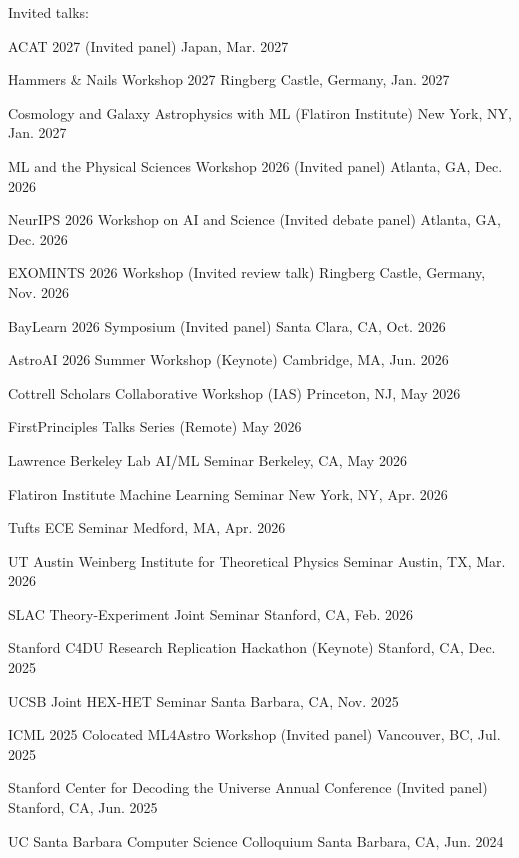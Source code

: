 \documentclass[letterpaper,11pt]{article}
\newenvironment{packed_itemize}{
\begin{itemize}[label=\raisebox{0.25ex}{\tiny$\bullet$}, topsep=0pt, partopsep=0pt]
  \setlength{\itemsep}{4.0pt}
  \setlength{\parskip}{0pt}
  \setlength{\parsep}{0pt}}{\end{itemize}
}
\begin{document}
\noindent
Invited talks:
\begin{packed_itemize}
  \item ACAT 2027 (Invited panel) \hfill Japan, Mar. 2027
  \item Hammers \& Nails Workshop 2027 \hfill Ringberg Castle, Germany, Jan. 2027
  \item Cosmology and Galaxy Astrophysics with ML (Flatiron Institute) \hfill New York, NY, Jan. 2027
  \item ML and the Physical Sciences Workshop 2026 (Invited panel) \hfill Atlanta, GA, Dec. 2026
  \item NeurIPS 2026 Workshop on AI and Science (Invited debate panel) \hfill Atlanta, GA, Dec. 2026
  \item EXOMINTS 2026 Workshop (Invited review talk) \hfill Ringberg Castle, Germany, Nov. 2026
  \item BayLearn 2026 Symposium (Invited panel) \hfill Santa Clara, CA, Oct. 2026
  \item AstroAI 2026 Summer Workshop (Keynote) \hfill Cambridge, MA, Jun. 2026
  \item Cottrell Scholars Collaborative Workshop (IAS) \hfill Princeton, NJ, May 2026
  \item FirstPrinciples Talks Series (Remote)  \hfill May 2026
  \item Lawrence Berkeley Lab AI/ML Seminar \hfill Berkeley, CA, May 2026
  \item Flatiron Institute Machine Learning Seminar \hfill New York, NY, Apr. 2026
  \item Tufts ECE Seminar \hfill Medford, MA, Apr. 2026
  \item UT Austin Weinberg Institute for Theoretical Physics Seminar \hfill Austin, TX, Mar. 2026
  \item SLAC Theory-Experiment Joint Seminar \hfill Stanford, CA, Feb. 2026
  \item Stanford C4DU Research Replication Hackathon (Keynote) \hfill Stanford, CA, Dec. 2025
  \item UCSB Joint HEX-HET Seminar \hfill Santa Barbara, CA, Nov. 2025
  \item ICML 2025 Colocated ML4Astro Workshop (Invited panel) \hfill Vancouver, BC, Jul. 2025
  \item Stanford Center for Decoding the Universe Annual Conference (Invited panel) \hfill Stanford, CA, Jun. 2025
  \item UC Santa Barbara Computer Science Colloquium \hfill Santa Barbara, CA, Jun. 2024

\end{packed_itemize}
\end{document}
